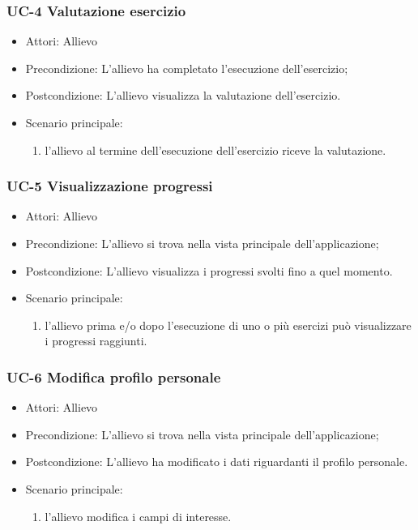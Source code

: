 	\subsubsection{UC-4 Valutazione esercizio}
	\begin{itemize}
			\item Attori: Allievo
			\item Precondizione: L'allievo ha completato l'esecuzione dell'esercizio;
			\item Postcondizione: L'allievo visualizza la valutazione dell'esercizio.
			\item Scenario principale:
				\begin{enumerate}
					\item l'allievo al termine dell'esecuzione dell'esercizio riceve la valutazione.
				\end{enumerate}
			\end{itemize}
	\subsubsection{UC-5 Visualizzazione progressi}
	\begin{itemize}
			\item Attori: Allievo
			\item Precondizione: L'allievo si trova nella vista principale dell'applicazione;
			\item Postcondizione: L'allievo visualizza i progressi svolti fino a quel momento.
			\item Scenario principale:
				\begin{enumerate}
					\item l'allievo prima e/o dopo l'esecuzione di uno o più esercizi può visualizzare i progressi raggiunti.
				\end{enumerate}
			\end{itemize}
	\subsubsection{UC-6 Modifica profilo personale}
	\begin{itemize}
			\item Attori: Allievo
			\item Precondizione: L'allievo si trova nella vista principale dell'applicazione;
			\item Postcondizione: L'allievo ha modificato i dati riguardanti il profilo personale.
			\item Scenario principale:
				\begin{enumerate}
					\item l'allievo modifica i campi di interesse.
				\end{enumerate}
	\end{itemize}